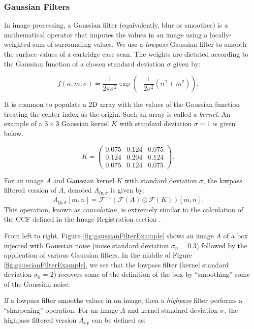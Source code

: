 \documentclass[11pt,]{isuthesis}
\begin{document}
\hypertarget{gaussian-filters}{%
\subsubsection{Gaussian Filters}\label{gaussian-filters}}

In image processing, a Gaussian filter (equivalently, blur or smoother) is a mathematical operator that imputes the values in an image using a locally-weighted sum of surrounding values.
We use a \emph{lowpass} Gaussian filter to smooth the surface values of a cartridge case scan.
The weights are dictated according to the Gaussian function of a chosen standard deviation \(\sigma\) given by:

\[
f(n,m;\sigma) = \frac{1}{2\pi\sigma^2} \exp\left(-\frac{1}{2\sigma^2}(n^2 + m^2)\right).
\]

It is common to populate a 2D array with the values of the Gaussian function treating the center index as the origin.
Such an array is called a \emph{kernel}.
An example of a \(3 \times 3\) Gaussian kernel \(K\) with standard deviation \(\sigma = 1\) is given below.

\[
K = 
\begin{pmatrix}
0.075 & 0.124 & 0.075 \\
0.124 & 0.204 & 0.124 \\
0.075 & 0.124 & 0.075
\end{pmatrix}.
\]

For an image \(A\) and Gaussian kernel \(K\) with standard deviation \(\sigma\), the lowpass filtered version of \(A\), denoted \(A_{lp,\sigma}\) is given by:
\[
A_{lp,\sigma}[m,n] = \mathcal{F}^{-1}\left(\mathcal{F}(A) \odot \mathcal{F}(K)\right)[m,n].
\]
This operation, known as \emph{convolution}, is extremely similar to the calculation of the CCF defined in the Image Registration section \citep{ISO1661021}.

From left to right, Figure \ref{fig:gaussianFilterExample} shows an image \(A\) of a box injected with Gaussian noise (noise standard deviation \(\sigma_n = 0.3\)) followed by the application of various Gaussian filters.
In the middle of Figure \ref{fig:gaussianFilterExample}, we see that the lowpass filter (kernel standard deviation \(\sigma_k = 2\)) recovers some of the definition of the box by ``smoothing'' some of the Gaussian noise.

If a lowpass filter smooths values in an image, then a \emph{highpass} filter performs a ``sharpening'' operation.
For an image \(A\) and kernel standard deviation \(\sigma\), the highpass filtered version \(A_{hp}\) can be defined as:
\end{document}
